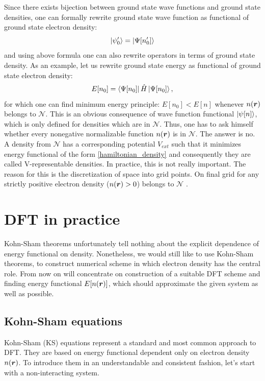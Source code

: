 \documentclass[openany, longbibliography,slovene,a4paper,12pt]{article}
\def\vec#1{\mbox{\boldmath$#1$}}
\begin{document}
Since there exists bijection between ground state wave functions and ground
state densities, one can formally rewrite ground state wave function as
functional of ground state electron density:
\begin{equation}
  \ket{\psi'_0} =  \ket{\Psi[n'_0]}
  \end{equation}
and using above formula one can also rewrite operators in terms of ground state
density. As an example, let us rewrite ground state energy as functional of
ground state electron density:
\begin{equation} \label{hamiltonian_density}
  E[n_0] = \bra{\Psi[n_0]}\hat H \ket{\Psi[n_0]},
  \end{equation}
for which one can find minimum energy principle: $E[n_0]<E[n]$ whenever $n(\vec r)$
belongs to $\mathcal N$. This is an obvious consequence of wave function functional
$\ket{\psi [n]}$, which is only defined for densities which are in $\mathcal N$.
Thus, one has to ask himself whether every nonegative normalizable function
$n(\vec r)$ is in $\mathcal N$.  The answer is no. A density from $\mathcal N$
has a corresponding potential $V_{ext}$ such that it minimizes energy functional
of the form \ref{hamiltonian_density} and consequently they are called V-representable densities.
In practice, this is not really important. The reason for this is the discretization of space
into grid points. On final grid for any strictly positive electron density
($n(\vec r) > 0$) belongs to $\mathcal N$ \cite{advanced_course}.


  \section{DFT in practice}
Kohn-Sham theorems unfortunately tell nothing about the explicit dependence of
energy functional on density. Nonetheless, we would still like to use Kohn-Sham
theorems, to construct numerical scheme in which electron density has the central
role. From now on will concentrate on construction of a suitable DFT scheme and
finding energy functional $E[n(\vec r)]$, which should approximate the given
system as well as possible.
  
  \subsection{Kohn-Sham equations}
  Kohn-Sham (KS) equations represent a standard and most common approach to DFT.
  They are based on energy functional dependent only on electron density $n(\vec
  r)$. To introduce them in an understandable and consistent fashion, let's start with a non-interacting system. 
 
\end{document}
